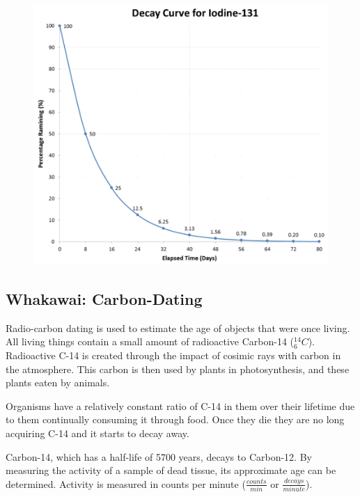 \documentclass[12pt]{report}
\begin{document}
{\begin{figure}[h]
	\centering
	\includegraphics[width=0.75\linewidth]{iodine-131.png}
\end{figure}

\newpage
\subsection{Whakawai: Carbon-Dating}
Radio-carbon dating is used to estimate the age of objects that were once living. All living things contain a small amount of radioactive Carbon-14 (${}^{14}_{6}C$). Radioactive C-14 is created through the impact of cosimic rays with carbon in the atmosphere. This carbon is then used by plants in photosynthesis, and these plants eaten by animals.

Organisms have a relatively constant ratio of C-14 in them over their lifetime due to them continually consuming it through food. Once they die they are no long acquiring C-14 and it starts to decay away.

Carbon-14, which has a half-life of 5700 years, decays to Carbon-12. By measuring the activity of a sample of dead tissue, its approximate age can be determined. Activity is measured in counts per minute ($\frac{counts}{min}$ or $\frac{decays}{minute}$).

}
\end{document}
